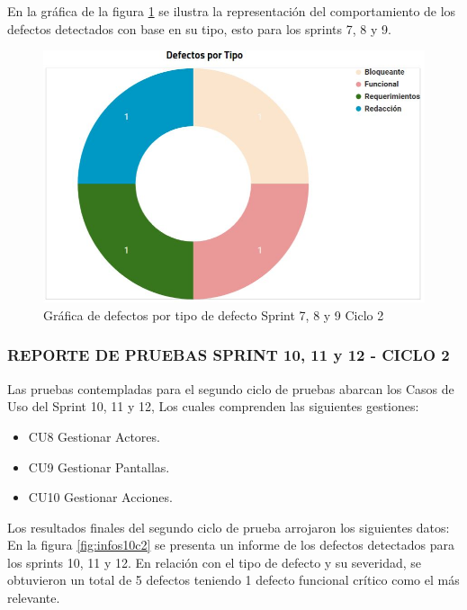En la gráfica de la figura \ref{fig:infos7c2-2} se ilustra la representación del comportamiento de los defectos detectados con base en su tipo, esto para los sprints 7, 8 y 9.

\begin{figure}[H]
	\begin{center}
		\includegraphics[width=.75\textwidth]{images/pruebas/s7c2-2}
		\caption{Gráfica de defectos por tipo de defecto Sprint 7, 8 y 9  Ciclo 2}
		\label{fig:infos7c2-2}
	\end{center}
\end{figure}

\subsubsection{REPORTE DE PRUEBAS SPRINT 10, 11 y 12 - CICLO 2}

Las pruebas contempladas para el segundo ciclo de pruebas abarcan los Casos de Uso del Sprint 10, 11 y 12, Los cuales comprenden las siguientes gestiones:

\begin{itemize}
	\item CU8 Gestionar Actores.
	\item CU9 Gestionar Pantallas.
	\item CU10 Gestionar Acciones.
\end{itemize}

Los resultados finales del segundo ciclo de prueba arrojaron los siguientes datos:\\

En la figura \ref{fig:infos10c2} se presenta un informe de los defectos detectados para los sprints 10, 11 y 12. En relación con el tipo de defecto y su severidad, se obtuvieron un total de 5 defectos teniendo 1 defecto funcional crítico como el más relevante.

